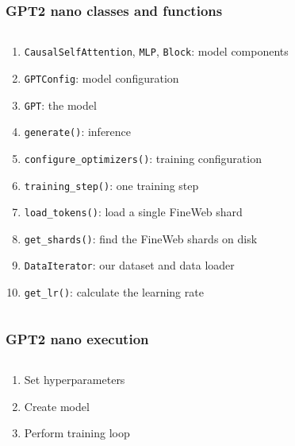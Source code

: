 \documentclass[
	notes=none,
	aspectratio=169
]{beamer}
\begin{document}

\begin{frame}
\frametitle{GPT2 nano classes and functions}

\begin{columns}[T]
\begin{column}[T]{1.0\textwidth}
\setlength{\parskip}{0.5em}

\vspace{0.0cm}
\begin{enumerate}
\setlength{\parskip}{0.0em}
\item {\tt CausalSelfAttention}, {\tt MLP}, {\tt Block}: model components
\item {\tt GPTConfig}: model configuration
\item {\tt GPT}: the model
\item {\tt generate()}: inference
\item {\tt configure\_optimizers()}: training configuration
\item {\tt training\_step()}: one training step
\item {\tt load\_tokens()}: load a single FineWeb shard
\item {\tt get\_shards()}: find the FineWeb shards on disk
\item {\tt DataIterator}: our dataset and data loader
\item {\tt get\_lr()}: calculate the learning rate
\end{enumerate}

\end{column}
\end{columns}

\end{frame}
\note{
}


\begin{frame}
\frametitle{GPT2 nano execution}

\begin{columns}[T]
\begin{column}[T]{1.0\textwidth}
\setlength{\parskip}{0.5em}

\vspace{0.0cm}
\begin{enumerate}
\setlength{\parskip}{0.5em}
\item Set hyperparameters
\item Create model
\item Perform training loop
\end{enumerate}

\end{column}
\end{columns}

\end{frame}
\note{
}
\end{document}
